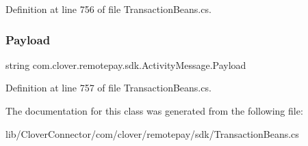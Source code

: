 Definition at line 756 of file Transaction\+Beans.\+cs.

\mbox{\label{classcom_1_1clover_1_1remotepay_1_1sdk_1_1_activity_message_a986e24b00f597aa74e0dcf8b25e42338}} 
\subsubsection{\texorpdfstring{Payload}{Payload}}
{\footnotesize\ttfamily string com.\+clover.\+remotepay.\+sdk.\+Activity\+Message.\+Payload}



Definition at line 757 of file Transaction\+Beans.\+cs.



The documentation for this class was generated from the following file\+:\begin{DoxyCompactItemize}
\item 
lib/\+Clover\+Connector/com/clover/remotepay/sdk/Transaction\+Beans.\+cs\end{DoxyCompactItemize}
